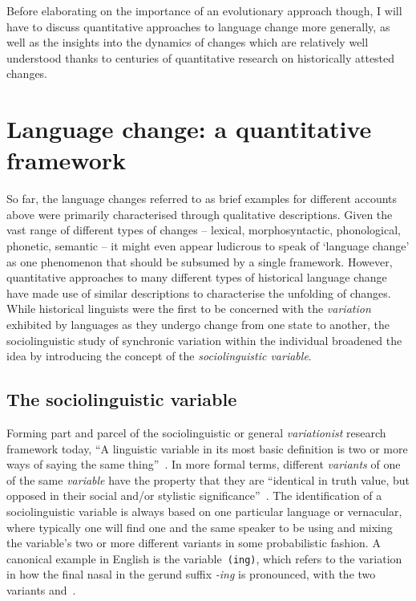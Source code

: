 Before elaborating on the importance of an evolutionary approach though, I will have to discuss quantitative approaches to language change more generally, as well as the insights into the dynamics of changes which are relatively well understood thanks to centuries of quantitative research on historically attested changes.

\section{Language change: a quantitative framework}

So far, the language changes referred to as brief examples for different accounts above were primarily characterised through qualitative descriptions. Given the vast range of different types of changes -- lexical, morphosyntactic, phonological, phonetic, semantic -- it might even appear ludicrous to speak of `language change' as one phenomenon that should be subsumed by a single framework.
However, quantitative approaches to many different types of historical language change have made use of similar descriptions to characterise the unfolding of changes. While historical linguists were the first to be concerned with the \emph{variation} exhibited by languages as they undergo change from one state to another, the sociolinguistic study of synchronic variation within the individual broadened the idea by introducing the concept of the \emph{sociolinguistic variable}.

\subsection{The sociolinguistic variable}
\label{sec:sociolinguisticvariable}

Forming part and parcel of the sociolinguistic or general \emph{variationist} research framework today,
``A linguistic variable in its most basic definition is two or more ways of saying the same thing''~\citep[p.4]{Tagliamonte2012}.
In more formal terms, different \emph{variants} of one of the same \emph{variable} have the property that they are ``identical in truth value, but opposed in their social and/or stylistic significance''~\citep[p.271]{Labov1972}. %
The identification of a sociolinguistic variable is always based on one particular language or vernacular, where typically one will find one and the same speaker to be using and mixing the variable's two or more different variants in some probabilistic fashion. A canonical example in English is the variable~\texttt{(ing)}, which refers to the variation in how the final nasal in the gerund suffix \emph{-ing} is pronounced, with the two variants \textipa{[n]} and~\textipa{[N]}.

